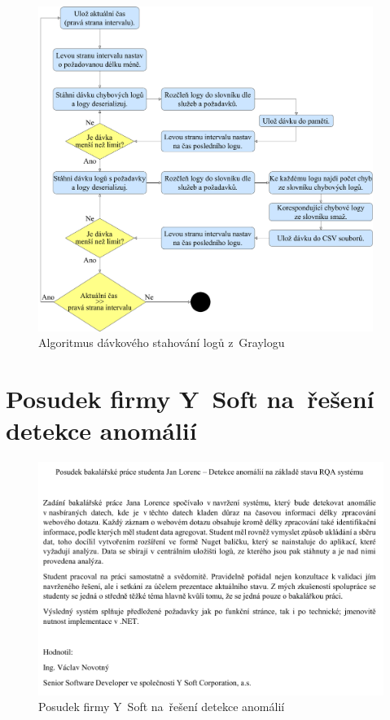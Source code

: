 \begin{figure}[tbh]
	\centering
	\includegraphics[width=0.97\textwidth]{obrazky/graylog-download-algorithm.pdf}
	\caption{Algoritmus dávkového stahování logů z~Graylogu}
\end{figure}

\chapter{Posudek firmy Y~Soft na~řešení detekce anomálií}
\label{priloha-D}
\begin{figure}[tbh]
	\centering
	\includegraphics[width=1\textwidth]{obrazky/posudek-ysoft.pdf}
	\caption{Posudek firmy Y~Soft na~řešení detekce anomálií}
\end{figure}

